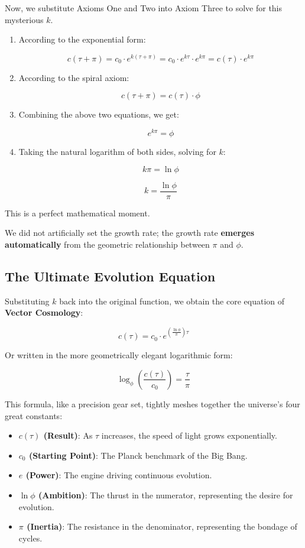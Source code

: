 Now, we substitute Axioms One and Two into Axiom Three to solve for this mysterious $k$.

\begin{enumerate}
\item According to the exponential form:

\[c(\tau + \pi) = c_0 \cdot e^{k(\tau + \pi)} = c_0 \cdot e^{k\tau} \cdot e^{k\pi} = c(\tau) \cdot e^{k\pi}\]

\item According to the spiral axiom:

\[c(\tau + \pi) = c(\tau) \cdot \phi\]

\item Combining the above two equations, we get:

\[e^{k\pi} = \phi\]

\item Taking the natural logarithm of both sides, solving for $k$:

\[k\pi = \ln \phi\]

\[k = \frac{\ln \phi}{\pi}\]
\end{enumerate}

This is a perfect mathematical moment.

We did not artificially set the growth rate; the growth rate \textbf{emerges automatically} from the geometric relationship between $\pi$ and $\phi$.

\subsection{The Ultimate Evolution Equation}

Substituting $k$ back into the original function, we obtain the core equation of \textbf{Vector Cosmology}:

\[c(\tau) = c_0 \cdot e^{\left( \frac{\ln \phi}{\pi} \right) \tau}\]

Or written in the more geometrically elegant logarithmic form:

\[\log_{\phi} \left( \frac{c(\tau)}{c_0} \right) = \frac{\tau}{\pi}\]

This formula, like a precision gear set, tightly meshes together the universe's four great constants:

\begin{itemize}
\item \textbf{$c(\tau)$ (Result)}: As $\tau$ increases, the speed of light grows exponentially.

\item \textbf{$c_0$ (Starting Point)}: The Planck benchmark of the Big Bang.

\item \textbf{$e$ (Power)}: The engine driving continuous evolution.

\item \textbf{$\ln \phi$ (Ambition)}: The thrust in the numerator, representing the desire for evolution.

\item \textbf{$\pi$ (Inertia)}: The resistance in the denominator, representing the bondage of cycles.
\end{itemize}

